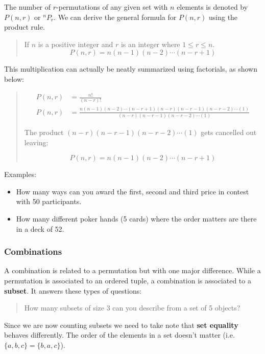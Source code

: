 The number of \textbf{\(r\)}-permutations of any given set with
\textbf{\(n\)} elements is denoted by \textbf{\(P(n,r)\)} or
\textbf{\(^nP_r\)}. We can derive the general formula for
\textbf{\(P(n,r)\)} using the product rule.

\begin{quote}
If \textbf{\(n\)} is a positive integer and \textbf{\(r\)} is an integer
where \textbf{\(1\leq r\leq n\)}. \[
P(n,r)=n(n-1)(n-2)\cdots(n-r+1)
\]
\end{quote}

This multiplication can actually be neatly summarized using factorials,
as shown below:

\begin{quote}
\[
\begin{aligned}
P(n,r)&=\frac{n!}{(n-r)!}\\
P(n,r)&=\frac{n(n-1)(n-2)\cdots(n-r+1)(n-r)(n-r-1)(n-r-2)\cdots(1)}{(n-r)(n-r-1)(n-r-2)\cdots(1)}
\end{aligned}
\]

The product \textbf{\((n-r)(n-r-1)(n-r-2)\cdots(1)\)} gets cancelled out
leaving:

\[
P(n,r)=n(n-1)(n-2)\cdots(n-r+1)
\]
\end{quote}

Examples:

\begin{itemize}
\tightlist
\item
  How many ways can you award the first, second and third price in
  contest with 50 participants.
\item
  How many different poker hands (5 cards) where the order matters are
  there in a deck of 52.
\end{itemize}

\hypertarget{combinations}{%
\subsubsection{Combinations}\label{combinations}}

A combination is related to a permutation but with one major difference.
While a permutation is associated to an ordered tuple, a combination is
associated to a \textbf{subset}. It answers these types of questions:

\begin{quote}
How many subsets of size 3 can you describe from a set of 5 objects?
\end{quote}

Since we are now counting subsets we need to take note that \textbf{set
equality} behaves differently. The order of the elements in a set
doesn't matter (i.e.~\textbf{\(\{a,b,c\}=\{b,a,c\}\)}).

